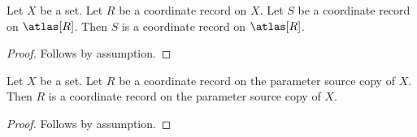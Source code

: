 \begin{proposition}\label{parameter_field_source}
    Let $X$ be a set.
    Let $R$ be a coordinate record on $X$.
    Let $S$ be a coordinate record on $\atlas[R]$.
    Then $S$ is a coordinate record on $\atlas[R]$.
\end{proposition}
\begin{proof}
    Follows by assumption.
\end{proof}

\begin{proposition}\label{parameter_function_source}
    Let $X$ be a set.
    Let $R$ be a coordinate record on the parameter source copy of $X$.
    Then $R$ is a coordinate record on the parameter source copy of $X$.
\end{proposition}
\begin{proof}
    Follows by assumption.
\end{proof}
